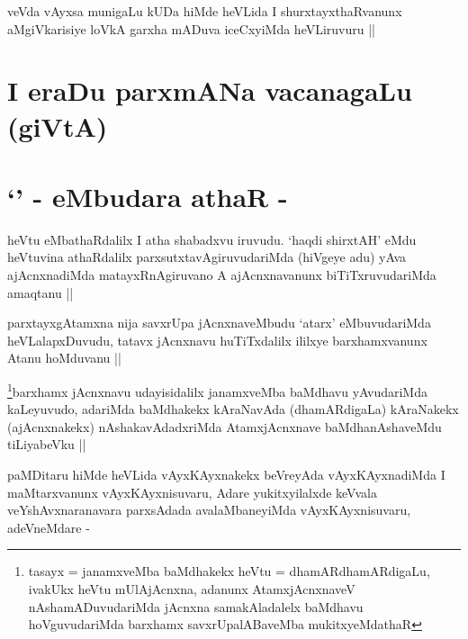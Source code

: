 \begin{artha}
veVda vAyxsa munigaLu kUDa hiMde heVLida I shurxtayxthaRvanunx
aMgiVkarisiye loVkA garxha mADuva iceCxyiMda heVLiruvuru ||
\end{artha}


\section*{I eraDu parxmANa vacanagaLu (giVtA)}

\section*{`\stext' - eMbudara athaR -}

\begin{artha}
heVtu eMbathaRdalilx I atha shabadxvu iruvudu. `haqdi shirxtAH' eMdu
heVtuvina athaRdalilx parxsutxtavAgiruvudariMda (hiVgeye adu) yAva
ajAcnxnadiMda matayxRnAgiruvano A ajAcnxnavanunx biTiTxruvudariMda
amaqtanu ||
\end{artha}


\begin{artha}
parxtayxgAtamxna nija savxrUpa jAcnxnaveMbudu `atarx' eMbuvudariMda
heVLalapxDuvudu, tatavx jAcnxnavu huTiTxdalilx ililxye barxhamxvanunx
Atanu hoMduvanu ||
\end{artha}


\begin{artha}
\footnote{tasayx = janamxveMba baMdhakekx heVtu = dhamARdhamARdigaLu,
  ivakUkx heVtu mUlAjAcnxna, adanunx AtamxjAcnxnaveV
  nAshamADuvudariMda jAcnxna samakAladalelx baMdhavu hoVguvudariMda
  barxhamx savxrUpalABaveMba mukitxyeMdathaR}barxhamx jAcnxnavu udayisidalilx janamxveMba baMdhavu yAvudariMda
kaLeyuvudo, adariMda baMdhakekx kAraNavAda (dhamARdigaLa) kAraNakekx
(ajAcnxnakekx) nAshakavAdadxriMda AtamxjAcnxnave baMdhanAshaveMdu
tiLiyabeVku ||
\end{artha}


\begin{artha}
paMDitaru hiMde heVLida vAyxKAyxnakekx beVreyAda vAyxKAyxnadiMda I
maMtarxvanunx vAyxKAyxnisuvaru, Adare yukitxyilalxde keVvala
veYshAvxnaranavara parxsAdada avalaMbaneyiMda vAyxKAyxnisuvaru, adeVneMdare  -
\end{artha}

